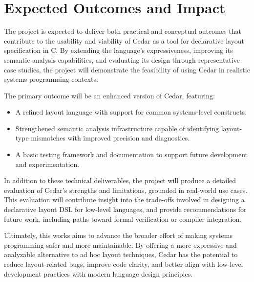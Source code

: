 \documentclass[12pt]{article}
\begin{document}
\section{Expected Outcomes and Impact}

The project is expected to deliver both practical and conceptual
outcomes that contribute to the usability and viability of Cedar as a tool
for declarative layout specification in C. By extending the language's
expressiveness, improving its semantic analysis capabilities, and evaluating
its design through representative case studies, the project will demonstrate
the feasibility of using Cedar in realistic systems programming contexts.

The primary outcome will be an enhanced version of Cedar, featuring:
\begin{itemize}
    \item A refined layout language with support for common systems-level
    constructs.
    \item Strengthened semantic analysis infrastructure capable of identifying
    layout-type mismatches with improved precision and diagnostics.
    \item A basic testing framework and documentation to support future
    development and experimentation.
\end{itemize}

In addition to these technical deliverables, the project will produce a
detailed evaluation of Cedar's strengths and limitations, grounded in real-world
use cases. This evaluation will contribute insight into the trade-offs involved
in designing a declarative layout DSL for low-level languages, and provide
recommendations for future work, including paths toward formal verification
or compiler integration.

Ultimately, this works aims to advance the broader effort of making systems
programming safer and more maintainable. By offering a more expressive and
analyzable alternative to ad hoc layout techniques, Cedar has the potential to
reduce layout-related bugs, improve code clarity, and better align with 
low-level development practices with modern language design principles.


\newpage
\printbibliography
\end{document}
